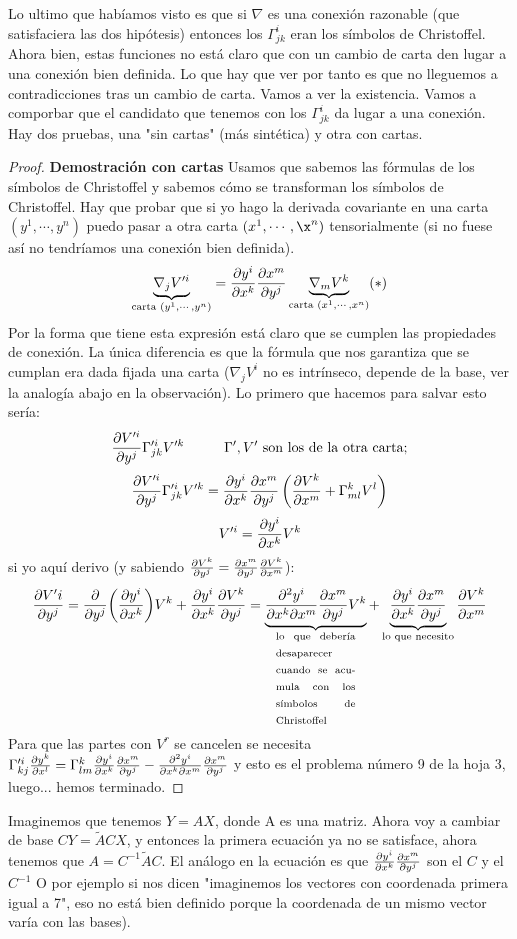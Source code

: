 \documentclass[palatino, bibnumbers]{apuntes}
\begin{document}
Lo ultimo que habíamos visto es que si $\nabla$ es una conexión razonable (que satisfaciera las dos hipótesis) entonces los $\Gamma^i_{jk}$ eran los símbolos de Christoffel. Ahora bien, estas funciones no está claro que con un cambio de carta den lugar a una conexión bien definida. Lo que hay que ver por tanto es que no lleguemos a contradicciones tras un cambio de carta.
Vamos a ver la existencia. Vamos a comporbar que el candidato que tenemos con los $\Gamma^i_{jk}$ da lugar a una conexión. Hay dos pruebas, una "sin cartas" (más sintética) y otra con cartas.
\begin{proof}\textbf{Demostración con cartas} Usamos que sabemos las fórmulas de los símbolos de Christoffel y sabemos cómo se transforman los símbolos de Christoffel. Hay que probar que si yo hago la derivada covariante en una carta $(y^1,\cdots,y^n)$ puedo pasar a otra carta $(x^1,\cdots,\x^n)$ tensorialmente (si no fuese así no tendríamos una conexión bien definida). $$\underbrace{\nabla_jV'^i}_{\text{carta }(y^1,\cdots,y^n)}=\pdv{y^i}{x^k}\pdv{x^m}{y^j}\underbrace{\nabla_mV^k}_{\text{carta }(x^1,\cdots,x^n)}(*)$$ Por la forma que tiene esta expresión está claro que se cumplen las propiedades de conexión. La única diferencia es que la fórmula que nos garantiza que se cumplan era dada fijada una carta ($\nabla_jV^i$ no es intrínseco, depende de la base, ver la analogía abajo en la observación). 
	Lo primero que hacemos para salvar esto sería: $$\pdv{V'^i}{y^j}\Gamma'^i_{jk}V'^k\hspace*{1cm}\Gamma',V'\text{ son los de la otra carta;}$$
	$$\pdv{V'^i}{y^j}\Gamma'^i_{jk}V'^k=\pdv{y^i}{x^k}\pdv{x^m}{y^j}\left(\pdv{V^k}{x^m}+\Gamma^k_{ml}V^l\right)$$
	$$V'^i=\pdv{y^i}{x^k}V^k$$ si yo aquí derivo (y sabiendo $\pdv{V^k}{y^j}=\pdv{x^m}{y^j}\pdv{V^k}{x^m}$): $$\pdv{V'i}{y^j}=\pdv{y^j}(\pdv{y^i}{x^k})V^k+\pdv{y^i}{x^k}\pdv{V^k}{y^j}=\underbrace{\pdv{y^i}{x^k}{x^m}\pdv{x^m}{y^j}V^k}_{\text{\parbox{2cm}{lo que debería desaparecer cuando se acumula con los símbolos de Christoffel}}}+\underbrace{\pdv{y^i}{x^k}\pdv{x^m}{y^j}}_{\text{lo que necesito}}\pdv{V^k}{x^m}$$
	Para que las partes con $V^r$ se cancelen se necesita $\Gamma'^i_{kj}\pdv{y^k}{x^l}=\Gamma^k_{lm}\pdv{y^i}{x^k}\pdv{x^m}{y^j}-\pdv{y^i}{x^k}{x^m}\pdv{x^m}{y^j}$ y esto es el problema número 9 de la hoja 3, luego... hemos terminado.
\end{proof}
\begin{obs} Imaginemos que tenemos $Y=AX$, donde A es una matriz. Ahora voy a cambiar de base $CY=\tilde{A}CX$, y entonces la primera ecuación ya no se satisface, ahora tenemos que $A=C^{-1}\tilde{A}C$. El análogo en la ecuación es que $\pdv{y^i}{x^k}\pdv{x^m}{y^j}$ son el $C$ y el $C^{-1}$
O por ejemplo si nos dicen "imaginemos los vectores con coordenada primera igual a 7", eso no está bien definido porque la coordenada de un mismo vector varía con las bases). 
\end{obs}
\end{document}
